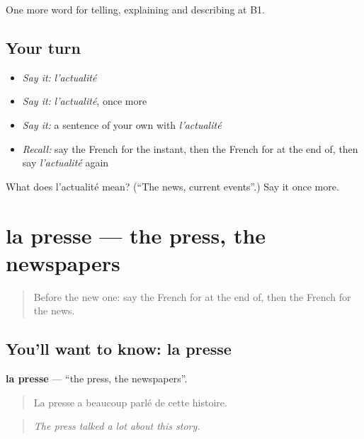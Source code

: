 \begin{grammarlens}[title={What you've built}]
One more word for telling, explaining and describing at B1.
\end{grammarlens}

\subsection*{Your turn}
\begin{itemize}
\raggedright
  \item \emph{Say it:} \emph{l'actualité}
  \item \emph{Say it:} \emph{l'actualité}, once more
  \item \emph{Say it:} a sentence of your own with \emph{l'actualité}
  \item \emph{Recall:} say the French for the instant, then the French for at the end of, then say \emph{l'actualité} again
\end{itemize}

\begin{tcolorbox}[breakable,colback=teal!4,colframe=teal!35!black,title={Before you move on}]
What does l'actualité mean? (\textquotedblleft{}The news, current events\textquotedblright{}.) Say it once more.
\end{tcolorbox}
\section[la presse]{la presse — the press, the newspapers}

\label{lesson:FR-C278-presse}



\begin{quote}
Before the new one: say the French for at the end of, then the French for the news.
\end{quote}

\subsection*{You'll want to know: la presse}
\textbf{la presse} — \textquotedblleft{}the press, the newspapers\textquotedblright{}.

\begin{quote}
La presse a beaucoup parlé de cette histoire.
\end{quote}

\begin{quote}
\emph{The press talked a lot about this story.}
\end{quote}

